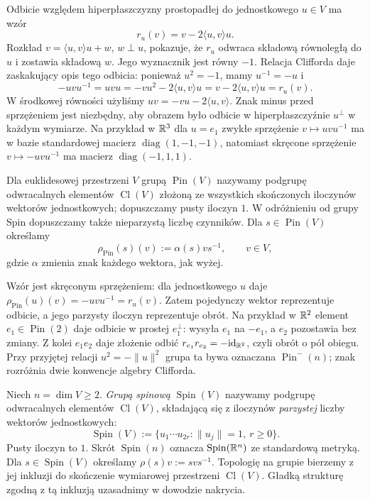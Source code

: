 Odbicie względem hiperpłaszczyzny prostopadłej
do jednostkowego $u\in V$ ma wzór
\begin{equation}\label{eq:spin-odbicie}
 r_u(v)=v-2\langle u,v\rangle u.
\end{equation}
Rozkład $v=\langle u,v\rangle u+w$, $w\perp u$,
pokazuje, że $r_u$ odwraca składową równoległą do $u$
i zostawia składową $w$. Jego wyznacznik jest równy $-1$.
Relacja Clifforda daje zaskakujący opis tego odbicia:
ponieważ $u^2=-1$, mamy $u^{-1}=-u$ i
\[
 -uvu^{-1}=uvu
 =-vu^2-2\langle u,v\rangle u
 =v-2\langle u,v\rangle u
 =r_u(v).
\]
W środkowej równości użyliśmy
$uv=-vu-2\langle u,v\rangle$. Znak minus przed
sprzężeniem jest niezbędny, aby obrazem było odbicie
w hiperpłaszczyźnie $u^\perp$ w każdym wymiarze.
Na przykład w $\mathbb{R}^3$ dla $u=e_1$ zwykłe sprzężenie
$v\mapsto uvu^{-1}$ ma w bazie standardowej macierz
$\operatorname{diag}(1,-1,-1)$, natomiast skręcone sprzężenie
$v\mapsto-uvu^{-1}$ ma macierz $\operatorname{diag}(-1,1,1)$.

\begin{definicja}
\label{def:pin-grupa}
Dla euklidesowej przestrzeni $V$ grupą $\operatorname{Pin}(V)$
nazywamy podgrupę odwracalnych elementów $\operatorname{Cl}(V)$
złożoną ze wszystkich skończonych iloczynów wektorów
jednostkowych; dopuszczamy pusty iloczyn $1$.
W odróżnieniu od grupy Spin dopuszczamy także nieparzystą
liczbę czynników. Dla $s\in\operatorname{Pin}(V)$ określamy
\[
 \rho_{\mathrm{Pin}}(s)(v):=\alpha(s)v s^{-1},
 \qquad v\in V,
\]
gdzie $\alpha$ zmienia znak każdego wektora, jak wyżej.
\end{definicja}

Wzór jest skręconym sprzężeniem: dla jednostkowego $u$
daje $\rho_{\mathrm{Pin}}(u)(v)=-uvu^{-1}=r_u(v)$.
Zatem pojedynczy wektor reprezentuje odbicie, a jego parzysty
iloczyn reprezentuje obrót. Na przykład w $\mathbb{R}^2$ element
$e_1\in\operatorname{Pin}(2)$ daje odbicie w prostej
$e_1^\perp$: wysyła $e_1$ na $-e_1$, a $e_2$ pozostawia
bez zmiany. Z kolei $e_1e_2$ daje złożenie odbić
$r_{e_1}r_{e_2}=-\mathrm{id}_{\mathbb{R}^2}$, czyli obrót o pół obiegu.
Przy przyjętej relacji $u^2=-\|u\|^2$ grupa ta bywa
oznaczana $\operatorname{Pin}^{-}(n)$; znak rozróżnia dwie
konwencje algebry Clifforda.

\begin{definicja}
\label{def:spin-grupa}
Niech $n=\dim V\geq2$. \emph{Grupą spinową}
$\operatorname{Spin}(V)$ nazywamy podgrupę
odwracalnych elementów $\operatorname{Cl}(V)$,
składającą się z iloczynów \emph{parzystej}
liczby wektorów jednostkowych:
\[
 \operatorname{Spin}(V)
 :=\{u_1\cdots u_{2r}:\|u_j\|=1,\ r\geq0\}.
\]
Pusty iloczyn to $1$. Skrót
$\operatorname{Spin}(n)$ oznacza
$\operatorname{Spin}(\mathbb{R}^n)$ ze standardową metryką.
Dla $s\in\operatorname{Spin}(V)$ określamy
$\rho(s)v:=svs^{-1}$.
Topologię na grupie bierzemy z jej inkluzji do skończenie
wymiarowej przestrzeni $\operatorname{Cl}(V)$. Gładką strukturę
zgodną z tą inkluzją uzasadnimy w dowodzie nakrycia.
\end{definicja}

